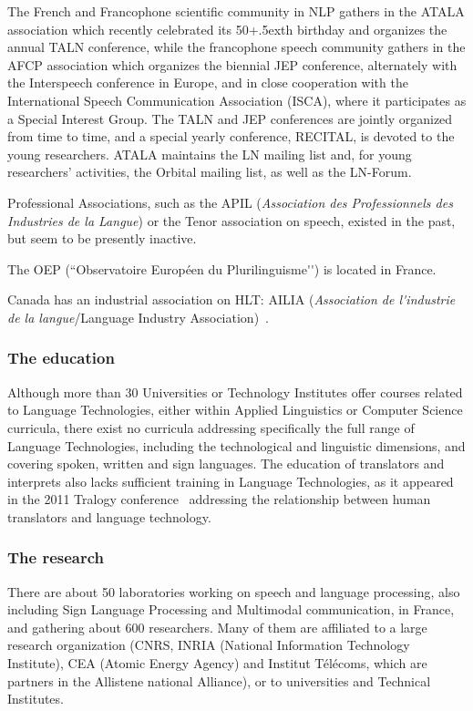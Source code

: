 \documentclass[]{../metanetpaper}
\begin{document}
\begin{multicols}{2}
The French and Francophone scientific community in NLP gathers in the
ATALA association which recently celebrated its 50\raise+.5ex\hbox{th} birthday and
organizes the annual TALN conference, while the francophone speech
community gathers in the AFCP association which organizes the biennial
JEP conference, alternately with the Interspeech conference in Europe,
and in close cooperation with the International Speech Communication
Association (ISCA), where it participates as a Special Interest
Group. The TALN and JEP conferences are jointly organized from time to
time, and a special yearly conference, RECITAL, is devoted to the
young researchers. ATALA maintains the LN mailing list and, for young
researchers’ activities, the Orbital mailing list, as well as the
LN-Forum.

Professional Associations, such as the APIL ({\em Association des
Professionnels des Industries de la Langue}) or the Tenor association
on speech, existed in the past, but seem to be presently inactive.

The OEP (``Observatoire Européen du Plurilinguisme{\mbox '}{\mbox '}) is located in France\cite{OEP}.

Canada has an industrial association on HLT: AILIA ({\em Association de
l{\mbox '}industrie de la langue}/Language Industry Association)~\cite{ailia}.

\subsubsection{The education}

Although more than 30 Universities or Technology Institutes offer
courses related to Language Technologies, either within Applied
Linguistics or Computer Science curricula, there exist no curricula
addressing specifically the full range of Language Technologies,
including the technological and linguistic dimensions, and covering
spoken, written and sign languages. The education of translators and
interprets also lacks sufficient training in Language Technologies, as
it appeared in the 2011 Tralogy conference~\cite{tralogy} addressing the
relationship between human translators and language technology.

\subsubsection{The research}

There are about 50 laboratories working on speech and language
processing, also including Sign Language Processing and Multimodal
communication, in France, and gathering about 600 researchers. Many of
them are affiliated to a large research organization (CNRS, INRIA
(National Information Technology Institute), CEA (Atomic Energy
Agency) and Institut Télécoms, which are partners in the Allistene
national Alliance), or to universities and Technical Institutes.


\end{multicols}
\end{document}
